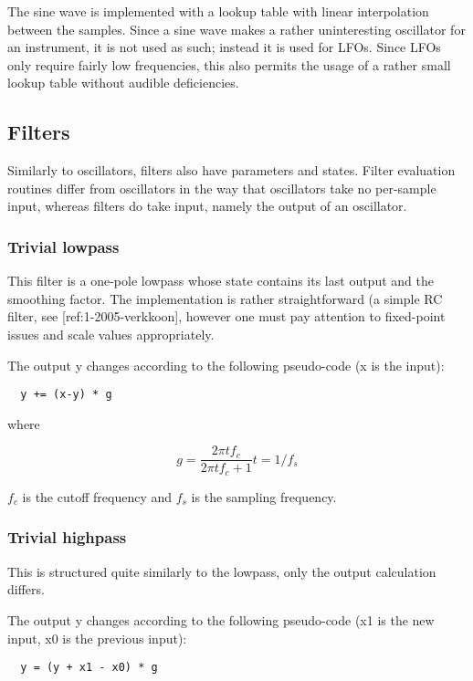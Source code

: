 \documentclass[10pt,a4paper,oneside]{article}
\begin{document}
The sine wave is implemented with a lookup table with linear interpolation between the samples. Since a sine wave makes a rather uninteresting oscillator for an instrument, it is not used as such; instead it is used for LFOs. Since LFOs only require fairly low frequencies, this also permits the usage of a rather small lookup table without audible deficiencies.

\subsection{Filters}


Similarly to oscillators, filters also have parameters and states. Filter evaluation routines differ from oscillators in the way that oscillators take no per-sample input, whereas filters do take input, namely the output of an oscillator.

\subsubsection{Trivial lowpass}


This filter is a one-pole lowpass whose state contains its last output and the smoothing factor. The implementation is rather straightforward (a simple RC filter, see [ref:1-2005-verkkoon], however one must pay attention to fixed-point issues and scale values appropriately.

The output y changes according to the following pseudo-code (x is the input):

\begin{verbatim}
  y += (x-y) * g
\end{verbatim}

where

\[
  g = \frac{2 \pi t f_c}{2 \pi t f_c + 1}
  t = 1 / f_s
\]

$f_c$ is the cutoff frequency and $f_s$ is the sampling frequency.

\subsubsection{Trivial highpass}

This is structured quite similarly to the lowpass, only the output calculation differs.

The output y changes according to the following pseudo-code (x1 is the new input, x0 is the previous input):

\begin{verbatim}
  y = (y + x1 - x0) * g
\end{verbatim}
\end{document}
